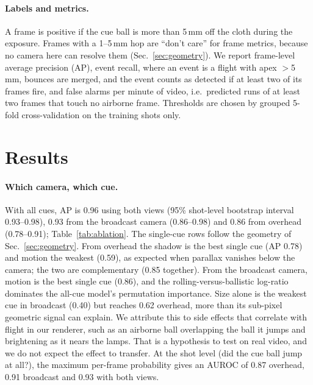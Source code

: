 \documentclass[11pt]{article}
\begin{document}
\paragraph{Labels and metrics.}
A frame is positive if the cue ball is more than 5\,mm off the cloth during the
exposure. Frames with a 1--5\,mm hop are ``don't care'' for frame metrics,
because no camera here can resolve them (Sec.~\ref{sec:geometry}). We report frame-level
average precision (AP), event recall, where an event is a flight with apex
$>$5\,mm, bounces are merged, and the event counts as detected if at least two of its frames fire, and false alarms per minute of video,
i.e.\ predicted runs of at least two frames that touch no airborne frame. Thresholds are chosen
by grouped 5-fold cross-validation on the training shots only.

\section{Results}\label{sec:results}

\begin{table}[t]
\centering\small

\caption{Cue ablation on \NumTest{} held-out shots (\NumEvents{} jump events).
AP: frame-level average precision. Ev.\,rec.: event recall. FA/min: false alarms per minute
of video. Recall and false alarms trade off through the threshold chosen on the training
shots, so compare cue strength by AP. Last row: mean absolute error of the regressed height on
airborne frames.}
\label{tab:ablation}
\end{table}

\paragraph{Which camera, which cue.}
With all cues, AP is 0.96 using both views (95\% shot-level bootstrap interval
0.93--0.98), 0.93 from the broadcast camera (0.86--0.98) and 0.86 from overhead
(0.78--0.91); Table~\ref{tab:ablation}. The single-cue rows follow the geometry
of Sec.~\ref{sec:geometry}. From overhead the shadow is the best single cue (AP
0.78) and motion the weakest (0.59), as expected when parallax vanishes below the
camera; the two are complementary (0.85 together). From the broadcast camera,
motion is the best single cue (0.86), and the rolling-versus-ballistic
log-ratio dominates the all-cue model's permutation importance. Size alone is
the weakest cue in broadcast (0.40) but reaches 0.62 overhead, more than its
sub-pixel geometric signal can explain. We attribute this to side effects
that correlate with flight in our renderer, such as an airborne ball overlapping
the ball it jumps and brightening as it nears the lamps. That is a hypothesis to
test on real video, and we do not expect the effect to transfer. At the shot level
(did the cue ball jump at all?), the maximum per-frame probability gives an AUROC of
0.87 overhead, 0.91 broadcast and 0.93 with both views.
\end{document}
